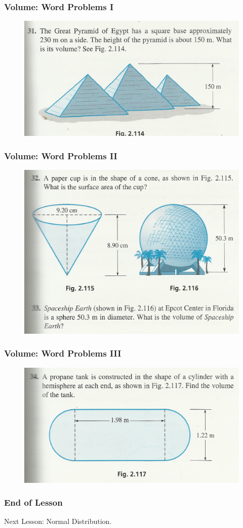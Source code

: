 \documentclass[xcolor=dvipsnames]{beamer}
\begin{document}
\begin{frame}
  \frametitle{Volume: Word Problems I}
  \begin{figure}[h]
    \includegraphics[scale=1]{./volume1.png}
  \end{figure}
\end{frame}

\begin{frame}
  \frametitle{Volume: Word Problems II}
  \begin{figure}[h]
    \includegraphics[scale=1]{./volume2.png}
  \end{figure}
\end{frame}

\begin{frame}
  \frametitle{Volume: Word Problems III}
  \begin{figure}[h]
    \includegraphics[scale=1]{./volume3.png}
  \end{figure}
\end{frame}


\begin{frame}
  \frametitle{End of Lesson}
Next Lesson: Normal Distribution.
\end{frame}
\end{document}
